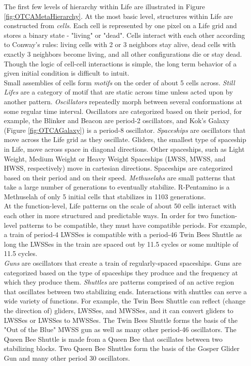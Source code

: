 {The first few levels of hierarchy within Life are illustrated in Figure \ref{fig:OTCAMetaHierarchy}.  At the most basic level, structures within Life are constructed from \textit{cells}.  Each cell is represented by one pixel on a Life grid and stores a binary state - "living" or "dead".  Cells interact with each other according to Conway's rules: living cells with 2 or 3 neighbors stay alive, dead cells with exactly 3 neighbors become living, and all other configurations die or stay dead.  Though the logic of cell-cell interactions is simple, the long term behavior of a given initial condition is difficult to intuit. \\

Small assemblies of cells form \textit{motifs} on the order of about 5 cells across.  \textit{Still Lifes} are a category of motif that are static across time unless acted upon by another pattern.  \textit{Oscillators} repeatedly morph between several conformations at some regular time interval.  Oscillators are categorized based on their period, for example, the Blinker and Beacon are period-2 oscillators, and Kok's Galaxy (Figure \ref{fig:OTCAGalaxy}) is a period-8 oscillator.  \textit{Spaceships} are oscillators that move across the Life grid as they oscillate.  Gliders, the smallest type of spaceship in Life, move across space in diagonal directions.  Other spaceships, such as Light Weight, Medium Weight or Heavy Weight Spaceships (LWSS, MWSS, and HWSS, respectively) move in cartesian directions.  Spaceships are categorized based on their period and on their speed.  \textit{Methuselahs} are small patterns that take a large number of generations to eventually stabilize.  R-Pentamino is a Methuselah of only 5 initial cells that stabilizes in 1103 generations.\\

At the function-level, Life patterns on the scale of about 50 cells interact with each other in more structured and predictable ways.  In order for two function-level patterns to be compatible, they must have compatible periods.  For example, a train of period-4 LWSSes is compatible with a period-46 Twin Bees Shuttle as long the LWSSes in the train are spaced out by 11.5 cycles or some multiple of 11.5 cycles.\\

\textit{Guns} are oscillators that create a train of regularly-spaced spaceships.  Guns are categorized based on the type of spaceships they produce and the frequency at which they produce them.  \textit{Shuttles} are patterns comprised of an active region that oscillates between two stabilizing ends.  Interactions with shuttles can serve a wide variety of functions.  For example, the Twin Bees Shuttle can reflect (change the direction of) gliders, LWSSes, and MWSSes, and it can convert gliders to LWSSes or LWSSes to MWSSes.  The Twin Bees Shuttle forms the basis of the "Out of the Blue" MWSS gun as well as many other period-46 oscillators.  The Queen Bee Shuttle  is made from a Queen Bee that oscillates between two stabilizing blocks.  Two Queen Bee Shuttles form the basis of the Gosper Glider Gun and many other period 30 oscillators.\\

}
